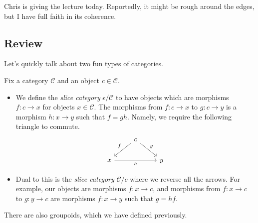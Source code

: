 
Chris is giving the lecture today. Reportedly, it might be rough around the edges, but I have full faith in its coherence.

\subsection{Review}
Let's quickly talk about two fun types of categories.
\begin{definition}
	Fix a category $\mathcal C$ and an object $c\in\mathcal C$.
	\begin{itemize}
		\item We define the \textit{slice category} $\mathcal c/\mathcal C$ to have objects which are morphisms $f:c\to x$ for objects $x\in\mathcal C$. The morphisms from $f:c\to x$ to $g:c\to y$ is a morphism $h:x\to y$ such that $f=gh$. Namely, we require the following triangle to commute.
		\[\begin{tikzcd}
			& c \\
			x && y
			\arrow["f"', from=1-2, to=2-1]
			\arrow["h"', from=2-1, to=2-3]
			\arrow["g", from=1-2, to=2-3]
		\end{tikzcd}\]
		\item Dual to this is the \textit{slice category} $\mathcal C/c$ where we reverse all the arrows. For example, our objects are morphisms $f:x\to c$, and morphisms from $f:x\to c$ to $g:y\to c$ are morphisms $f:x\to y$ such that $g=hf$.
	\end{itemize}
\end{definition}
There are also groupoids, which we have defined previously.

